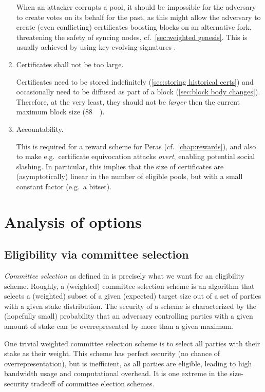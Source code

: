 \begin{enumerate}
  When an attacker corrupts a pool, it should be impossible for the adversary to create votes on its behalf for the past, as this might allow the adversary to create (even conflicting) certificates boosting blocks on an alternative fork, threatening the safety of syncing nodes, cf.~\cref{sec:weighted genesis}.
  This is usually achieved by using key-evolving signatures \parencite{bellare1999forward}.
\item
  Certificates shall not be too large.

  Certificates need to be stored indefinitely (\cref{sec:storing historical certs}) and occasionally need to be diffused as part of a block (\cref{sec:block body changes}).
  Therefore, at the very least, they should not be \emph{larger} then the current maximum block size (\qty{88}{\kibi\byte}).
\item
  Accountability.

  This is required for a reward scheme for Peras (cf.\ \cref{chap:rewards}), and also to make e.g.\ certificate equivocation attacks \emph{overt}, enabling potential social slashing.
  In particular, this implies that the size of certificates are (asymptotically) linear in the number of eligible pools, but with a small constant factor (e.g.\ a bitset).
\end{enumerate}

\section{Analysis of options}

\subsection{Eligibility via committee selection}

\emph{Committee selection} as defined in \cite{gavzi2023fait} is precisely what we want for an eligibility scheme.
Roughly, a (weighted) committee selection scheme is an algorithm that selects a (weighted) subset of a given (expected) target size out of a set of parties with a given stake distribution.
The security of a scheme is characterized by the (hopefully small) probability that an adversary controlling parties with a given amount of stake can be overrepresented by more than a given maximum.

One trivial weighted committee selection scheme is to select all parties with their stake as their weight.
This scheme has perfect security (no chance of overrepresentation), but is inefficient, as all parties are eligible, leading to high bandwidth usage and computational overhead.
It is one extreme in the size-security tradeoff of committee election schemes.

